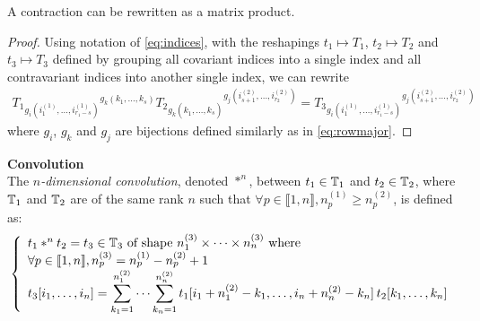 \begin{proposition}%
A contraction can be rewritten as a matrix product.
\label{prop:matprodeq}
\end{proposition}
\begin{proof}
Using notation of \eqref{eq:indices}, with the reshapings $t_1 \mapsto T_1$, $t_2 \mapsto T_2$ and $t_3 \mapsto T_3$ defined by grouping all covariant indices into a single index and all contravariant indices into another single index, we can rewrite
\begin{gather*}
T_1 \hspace{0pt}_{g_i(i_1^{(1)}, \ldots, i_{r_1-s}^{(1)})} \hspace{0pt}^{g_k(k_1, \ldots, k_s)} 
T_2 \hspace{0pt}_{g_k(k_1^{\phantom{(}}, \ldots, k_s^{\phantom{(}})} \hspace{0pt}^{g_j(i_{s+1}^{(2)}, \ldots, i_{r_2}^{(2)})} =
T_3 \hspace{0pt}_ {g_i(i_1^{(1)}, \ldots, i_{r_1-s}^{(1)})} \hspace{0pt}^{g_j(i_{s+1}^{(2)}, \ldots, i_{r_2}^{(2)})}
\end{gather*}
where $g_i$, $g_k$ and $g_j$ are bijections defined similarly as in \eqref{eq:rowmajor}.
\end{proof}

\begin{definition}\textbf{Convolution}\\
The \emph{$n$-dimensional convolution}, denoted $\ast^n$, between $t_1 \in \mathbb{T}_1$ and $t_2 \in \mathbb{T}_2$, where $\mathbb{T}_1$ and $\mathbb{T}_2$ are of the same rank $n$ such that $\forall p \in \llbracket 1, n \rrbracket, n_p^{(1)} \ge n_p^{(2)}$, is defined as:
\begin{gather*}
\left\{
  \begin{array}{l}
    t_1 \ast^n t_2 = t_3 \in  \mathbb{T}_3 \text{ of shape } n_1^{(3)} \times \cdots \times n_n^{(3)}
    \text{ where} \\
    \forall p \in \llbracket 1, n \rrbracket, n_p^{(3)} = n_p^{(1)} - n_p^{(2)} + 1 \\
    t_3[i_1, \ldots, i_n] =
    \displaystyle \sum_{k_1=1}^{n_1^{(2)}} \cdots \sum_{k_n=1}^{n_n^{(2)}}
    t_1[i_1 + n_1^{(2)} - k_1, \ldots, i_n + n_n^{(2)} - k_n] \hspace{2pt} t_2[k_1, \ldots, k_n] \\
  \end{array}
\right.
\end{gather*}
\label{def:convdef}
\end{definition}

